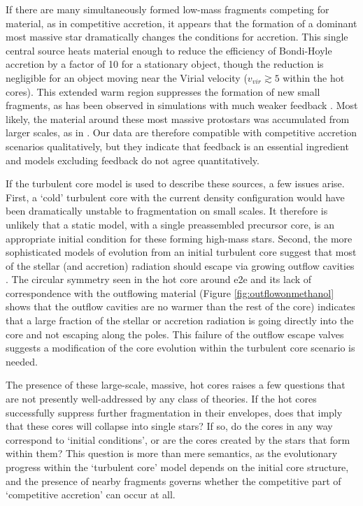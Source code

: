 \documentclass{emulateapj}
\begin{document}
If there are many simultaneously formed low-mass fragments competing for
material, as in competitive accretion, it appears that the formation of a
dominant most massive star dramatically changes the conditions for accretion.
This single central source heats material enough to reduce the efficiency of
Bondi-Hoyle accretion by a factor of 10 for a stationary object, though the
reduction is negligible for an object moving near the Virial velocity ($v_{vir}
\gtrsim 5$ \kms within the hot cores).  This extended warm region suppresses
the formation of new small fragments, as has been observed in simulations with
much weaker feedback \citep[e.g.][]{Bate2009a}.  Most likely, the material
around these most massive protostars was accumulated from larger scales, as in
\citet{Smith2009f}.  Our data are therefore compatible with competitive
accretion scenarios qualitatively, but they indicate that feedback is an essential
ingredient and models excluding feedback do not agree quantitatively.


If the turbulent core model is used to describe these sources, a few issues
arise.  First, a `cold' turbulent core with the current density configuration
would have been dramatically unstable to fragmentation on small scales.  It
therefore is unlikely that a static model, with a single preassembled precursor
core, is an appropriate initial condition for these forming high-mass stars.
Second, the more sophisticated models of evolution from an initial turbulent
core suggest that most of the stellar (and accretion) radiation should escape
via growing outflow cavities \citep{Zhang2011a,Zhang2013h,Zhang2014e}.  The
circular symmetry seen in the hot core around e2e and its lack of
correspondence with the outflowing material (Figure \ref{fig:outflowonmethanol}
shows that the outflow cavities are no warmer than the rest of the core)
indicates that a large fraction of the stellar or accretion radiation is going
directly into the core and not escaping along the poles.  This failure of the
outflow escape valves suggests a modification of the core evolution within the
turbulent core scenario is needed.

The presence of these large-scale, massive, hot cores raises a few questions
that are not presently well-addressed by any class of theories.  If the hot
cores successfully suppress further fragmentation in their envelopes, does that
imply that these cores will collapse into single stars?  If so, do the cores in
any way correspond to `initial conditions', or are the cores created by the
stars that form within them?  This question is more than mere semantics,
as the evolutionary progress within the `turbulent core' model depends on the
initial core structure, and the presence of nearby fragments governs whether
the competitive part of `competitive accretion' can occur at all.
\end{document}
